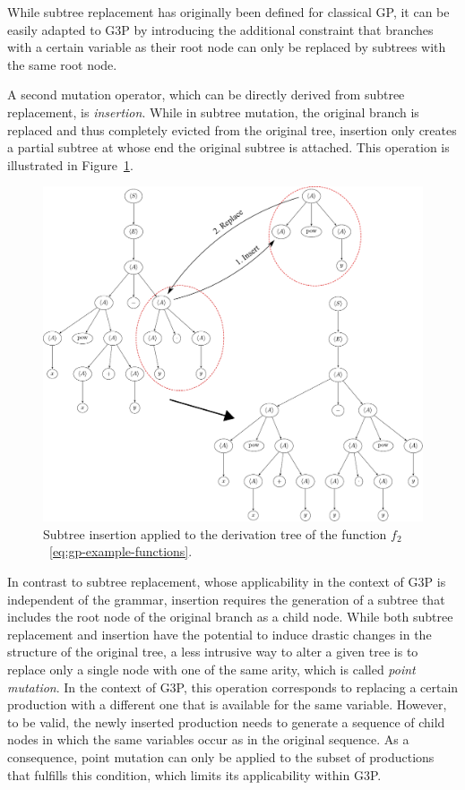 While subtree replacement has originally been defined for classical GP, it can be easily adapted to G3P by introducing the additional constraint that branches with a certain variable as their root node can only be replaced by subtrees with the same root node.

A second mutation operator, which can be directly derived from subtree replacement, is \emph{insertion}.
While in subtree mutation, the original branch is replaced and thus completely evicted from the original tree, insertion only creates a partial subtree at whose end the original subtree is attached.
This operation is illustrated in Figure~\ref{fig:gp-insertion-mutation}.
\begin{figure}
	\centering
	\includegraphics[scale=0.46]{figures/trees/subtree_insertion_mutation.pdf}
	\caption{Subtree insertion applied to the derivation tree of the function $f_2$~\eqref{eq:gp-example-functions}.}
	\label{fig:gp-insertion-mutation}
\end{figure}
In contrast to subtree replacement, whose applicability in the context of G3P is independent of the grammar, insertion requires the generation of a subtree that includes the root node of the original branch as a child node.
While both subtree replacement and insertion have the potential to induce drastic changes in the structure of the original tree, a less intrusive way to alter a given tree is to replace only a single node with one of the same arity, which is called \emph{point mutation}.
In the context of G3P, this operation corresponds to replacing a certain production with a different one that is available for the same variable.
However, to be valid, the newly inserted production needs to generate a sequence of child nodes in which the same variables occur as in the original sequence.
As a consequence, point mutation can only be applied to the subset of productions that fulfills this condition, which limits its applicability within G3P.

